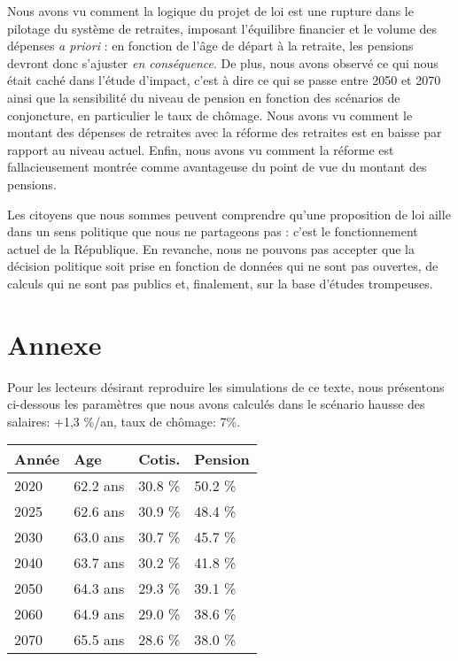\documentclass[10pt]{article}
\begin{document}
Nous avons vu comment la logique du projet de loi est une 
rupture dans le pilotage du système de retraites, 
imposant l'équilibre financier et le volume des dépenses 
\emph{a priori} : en fonction de l'âge de départ à la retraite, 
les pensions devront donc s'ajuster \emph{en conséquence}. 
De plus, nous avons observé ce qui nous était caché dans l'étude 
d'impact, c'est à dire ce qui se passe entre 2050 et 2070 ainsi que 
la sensibilité du niveau de pension en fonction des scénarios 
de conjoncture, en particulier le taux de chômage. 
Nous avons vu comment le montant des dépenses de retraites avec la réforme 
des retraites est en baisse par rapport au niveau actuel. 
Enfin, nous avons vu comment la réforme est fallacieusement 
montrée comme avantageuse du point de vue du montant des pensions. 

Les citoyens que nous sommes peuvent comprendre qu'une proposition de loi 
aille dans un sens politique que nous ne partageons pas : c'est le 
fonctionnement actuel de la République. 
En revanche, nous ne pouvons pas accepter que la décision politique soit 
prise en fonction de données qui ne sont pas ouvertes, 
de calculs qui ne sont pas publics et, finalement, sur la base d'études trompeuses. 


\section{Annexe}

Pour les lecteurs désirant reproduire les simulations de ce texte, 
nous présentons ci-dessous les paramètres que nous avons calculés dans 
le scénario hausse des salaires: +1,3 \%/an, taux de chômage: 7\%.

\begin{center}
\begin{tabular}{l|lll}
\textbf{Année} & \textbf{Age} & \textbf{Cotis.} & \textbf{Pension} \\
\hline
2020 & 62.2 ans & 30.8 \% & 50.2 \% \\
2025 & 62.6 ans & 30.9 \% & 48.4 \% \\
2030 & 63.0 ans & 30.7 \% & 45.7 \% \\
2040 & 63.7 ans & 30.2 \% & 41.8 \% \\
2050 & 64.3 ans & 29.3 \% & 39.1 \% \\
2060 & 64.9 ans & 29.0 \% & 38.6 \% \\
2070 & 65.5 ans & 28.6 \% & 38.0 \%
\end{tabular}
\end{center}
\end{document}
